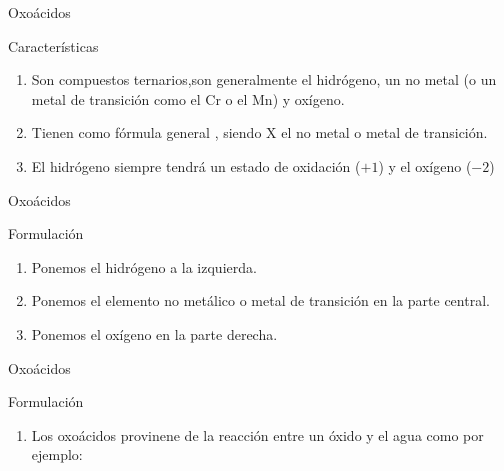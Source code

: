 \documentclass{beamer}
\begin{document}
\begin{frame}[c]{Oxoácidos}
    \begin{block}{\Large Características}
        \begin{enumerate}[label=\itembolascolor{\arabic*}{mDarkTeal}]
            \item Son compuestos ternarios,son generalmente el hidrógeno, un no metal (o un metal de transición como el Cr o el Mn) y oxígeno.
            \item Tienen como fórmula general , siendo X el no metal o metal de transición.
            \item El hidrógeno siempre tendrá un estado de oxidación ($+1$) y el oxígeno ($-2$)
        \end{enumerate}

    \end{block}
\end{frame}

\begin{frame}[c]{Oxoácidos}
    \begin{exampleblock}{\Large Formulación}
        \begin{enumerate}[label=\itembolascolor{\arabic*}{mDarkTeal}]
            \item Ponemos el hidrógeno a la izquierda.
            \item Ponemos el elemento no metálico o metal de transición en la parte central.
            \item Ponemos el oxígeno en la parte derecha.
        \end{enumerate}
    \end{exampleblock}
\end{frame}

\begin{frame}[t]{Oxoácidos}
    \begin{exampleblock}{\Large Formulación}
        \begin{enumerate}[label=\itembolascolor{\arabic*}{mDarkTeal}]
            \addtocounter{enumi}{3} %
            \item Los oxoácidos provinene de la reacción entre un óxido y el agua como por ejemplo:
                  \begin{center}
                      \\
                      \\
                      \\
                      \\
                      \\
                      \\
                      \\
                  \end{center}
        \end{enumerate}
    \end{exampleblock}
\end{frame}
\end{document}
